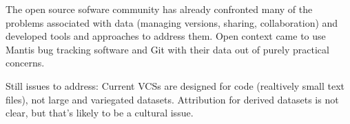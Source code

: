 \documentclass[10pt,a4paper,twocolumn]{article}
\begin{document}
The open source sofware community has already confronted many of the problems associated with data (managing versions, sharing, collaboration) and developed tools and approaches to address them. 
Open context came to use Mantis bug tracking software and Git with their data out of purely practical concerns.

Still issues to address: Current VCSs are designed for code (realtively small text files), not large and variegated datasets. 
Attribution for derived datasets is not clear, but that's likely to be a cultural issue.


\nocite{*}
{\small
}








\end{document}
